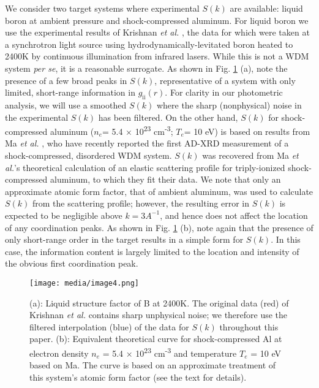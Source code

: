 We consider two target systems where experimental \(S(k)\) are
available: liquid boron at ambient pressure and shock-compressed
aluminum. For liquid boron we use the experimental results of Krishnan
\emph{et al.}
 \cite{KRISHNAN1998STRUCTURE, KRISHNAN2000X},
the data for which were taken at a synchrotron light source using
hydrodynamically-levitated boron heated to 2400K by continuous
illumination from infrared lasers. While this is not a WDM system
\emph{per se}, it is a reasonable surrogate. As shown in Fig. \ref{edimage4} (a),
note the presence of a few broad peaks in \(S(k)\), representative of a
system with only limited, short-range information in
\(g_{\text{ii}}\left( r \right)\). For clarity in our photometric
analysis, we will use a smoothed \(S(k)\) where the sharp (nonphysical)
noise in the experimental \(S(k)\) has been filtered. On the other hand,
\(S(k)\) for shock-compressed aluminum (\(n_{e}\)= 5.4 ×
10\textsuperscript{23} cm\textsuperscript{-3}; \(T_{e}\)= 10 eV) is
based on results from Ma \emph{et
al.} \cite{ma2013x},
who have recently reported the first AD-XRD measurement of a
shock-compressed, disordered WDM system. \(S(k)\) was recovered from Ma
\emph{et al.}'s theoretical calculation of an elastic scattering profile
for triply-ionized shock-compressed aluminum, to which they fit their
data. We note that only an approximate atomic form factor, that of
ambient aluminum, was used to calculate \(S(k)\) from the scattering
profile; however, the resulting error in \(S(k)\) is expected to be
negligible above \(k = 3A^{- 1}\), and hence does not affect the
location of any coordination peaks. As shown in Fig. \ref{edimage4} (b), note again
that the presence of only short-range order in the target results in a
simple form for \(S(k)\). In this case, the information content is
largely limited to the location and intensity of the obvious first
coordination peak.

\begin{figure}[h] \label{edimage4}
\caption{ (a): Liquid structure factor of B at 2400K. The original data
(red) of Krishnan \emph{et al.} 
\cite{Krishnan1998structure}
contains sharp unphysical noise; we therefore use the filtered
interpolation (blue) of the data for \(S(k)\) throughout this paper.
(b): Equivalent theoretical curve for shock-compressed Al at electron
density \(n_{e}\) = 5.4 × 10\textsuperscript{23} cm\textsuperscript{-3}
and temperature \(T_{e}\) = 10 eV based on Ma. \cite{ma2013x} 
The curve is based on an approximate treatment of this system's atomic
form factor (see the text for details).}
\centering
\texttt{[image: media/image4.png]}
\end{figure}


